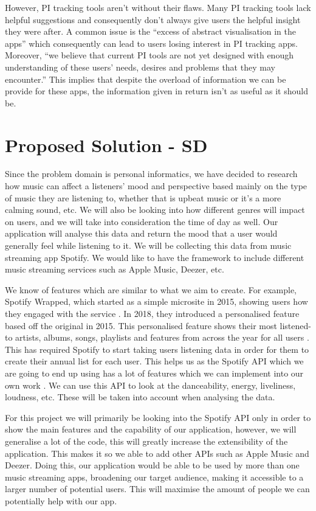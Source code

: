 \documentclass[11pt]{report}
\begin{document}
However, PI tracking tools aren’t without their flaws. Many PI tracking tools lack helpful suggestions and consequently don’t always give users the helpful insight they were after. A common issue is the “excess of abstract visualisation in the apps” \cite{Rapp2016} which consequently can lead to users losing interest in PI tracking apps. Moreover, “we believe that current PI tools are not yet designed with enough understanding of these users’ needs, desires and problems that they may encounter.” \cite{Rapp2016} This implies that despite the overload of information we can be provide for these apps, the information given in return isn’t as useful as it should be.


\section{Proposed Solution - SD}

Since the problem domain is personal informatics, we have decided to research how music can affect a listeners' mood and perspective based mainly on the type of music they are listening to, whether that is upbeat music or it’s a more calming sound, etc. We will also be looking into how different genres will impact on users, and we will take into consideration the time of day as well. Our application will analyse this data and return the mood that a user would generally feel while listening to it. We will be collecting this data from music streaming app Spotify. We would like to have the framework to include different music streaming services such as Apple Music, Deezer, etc.

We know of features which are similar to what we aim to create. For example, Spotify Wrapped, which started as a simple microsite in 2015, showing users how they engaged with the service \cite{Swant}. In 2018, they introduced a personalised feature based off the original in 2015. This personalised feature shows their most listened-to artists, albums, songs, playlists and features from across the year for all users \cite{Somerville}. This has required Spotify to start taking users listening data in order for them to create their annual list for each user. This helps us as the Spotify API which we are going to end up using has a lot of features which we can implement into our own work \cite{WebAPI}. We can use this API to look at the danceability, energy, liveliness, loudness, etc. These will be taken into account when analysing the data.

For this project we will primarily be looking into the Spotify API only in order to show the main features and the capability of our application, however, we will generalise a lot of the code, this will greatly increase the extensibility of the application. This makes it so we able to add other APIs such as Apple Music and Deezer. Doing this, our application would be able to be used by more than one music streaming apps, broadening our target audience, making it accessible to a larger number of potential users. This will maximise the amount of people we can potentially help with our app.
\end{document}
